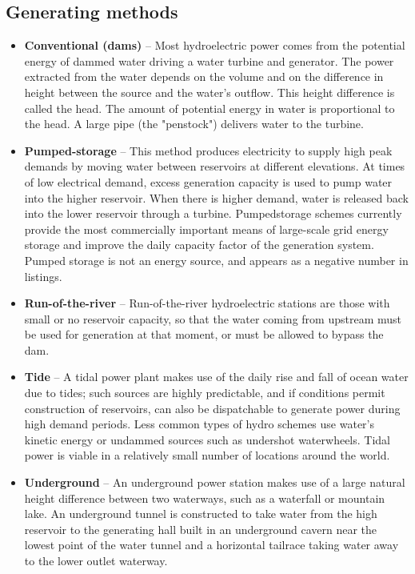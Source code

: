 \subsection{Generating methods}
\begin{itemize}
\item \textbf{Conventional (dams)} – Most hydroelectric power comes from the potential energy of dammed water driving a water turbine and generator. The power extracted from the water depends on the volume and on the difference in height between the source and the water's outflow. This height difference is called the head. The amount of potential energy in water is proportional to the head. A large pipe (the "penstock") delivers water to the turbine. 
\item \textbf{Pumped-storage} – This method produces electricity to supply high peak demands by moving water between reservoirs at different elevations. At times of low electrical demand, excess generation capacity is used to pump water into the higher reservoir. When there is higher demand, water is released back into the lower reservoir through a turbine. Pumpedstorage schemes currently provide the most commercially important means of large-scale grid energy storage and improve the daily capacity factor of the generation system. Pumped storage is not an energy source, and appears as a negative number in listings.
\item \textbf{Run-of-the-river} – Run-of-the-river hydroelectric stations are those with small or no reservoir capacity, so that the water coming from upstream must be used for generation at that moment, or must be allowed to bypass the dam.
\item \textbf{Tide} – A tidal power plant makes use of the daily rise and fall of ocean water due to tides; such sources are highly predictable, and if conditions permit construction of reservoirs, can also be dispatchable to generate power during high demand periods. Less common types of hydro schemes use water's kinetic energy or undammed sources such as undershot waterwheels. Tidal power is viable in a relatively small number of locations around the world.
\item \textbf{Underground} – An underground power station makes use of a large natural height difference between two waterways, such as a waterfall or mountain lake. An underground tunnel is constructed to take water from the high reservoir to the generating hall built in an underground cavern near the lowest point of the water tunnel and a horizontal tailrace taking water away to the lower outlet waterway.
\end{itemize}
